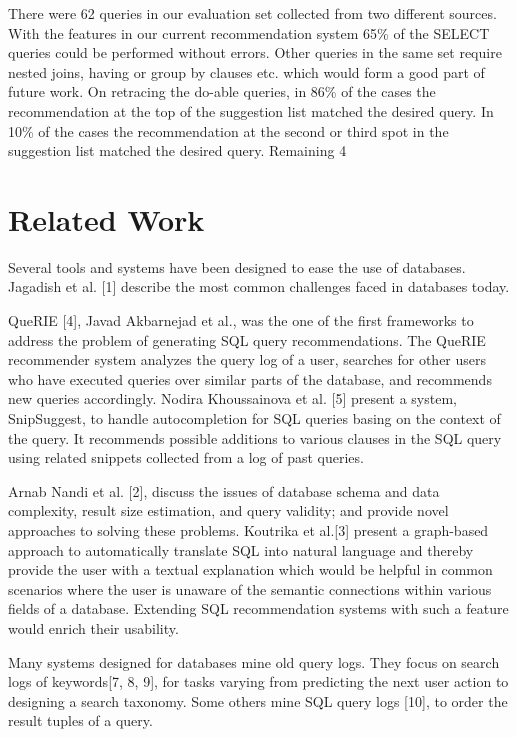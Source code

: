 \documentclass{acm_proc_article-sp}
\begin{document}
There were 62 queries in our evaluation set collected from two different sources. With the features in our current recommendation system 65\% of the SELECT queries could be performed without errors. Other queries in the same set require nested joins, having or group by clauses etc. which would form a good part of future work. On retracing the do-able queries, in 86\% of the cases the recommendation at the top of the suggestion list matched the desired query. In 10\% of the cases the recommendation at the second or third spot in the suggestion list matched the desired query. Remaining 4%

\section{Related Work}
Several tools and systems have been designed to ease the use of databases. Jagadish et al. [1] describe the most common challenges faced in databases today.

QueRIE [4], Javad Akbarnejad et al., was the one of the first frameworks to address the problem of generating SQL query recommendations. The QueRIE recommender system analyzes the query log of a user, searches for other users who have executed queries over similar parts of the database, and recommends new queries accordingly. 
Nodira Khoussainova et al. [5] present a system, SnipSuggest, to handle autocompletion for SQL queries basing on the context of the query.  It recommends possible additions to various clauses in the SQL query using related snippets collected from a log of past queries. 

Arnab Nandi et al. [2], discuss the issues of database schema and data complexity, result size estimation, and query validity; and provide novel approaches to solving these problems. Koutrika et al.[3] present a graph-based approach to automatically translate SQL into natural language and thereby provide the user with a textual explanation which would be helpful in common scenarios where the user is unaware of the semantic connections within various fields of a database. Extending SQL recommendation systems with such a feature would enrich their usability.

Many systems designed for databases mine old query logs. They focus on search logs of keywords[7, 8, 9], for tasks varying from predicting the next user action to designing a search taxonomy. Some others mine SQL query logs [10], to order the result tuples of a query. 
\end{document}
